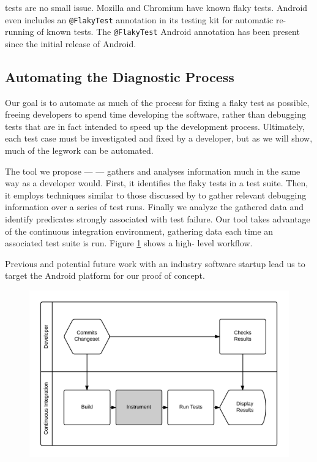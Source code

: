 \Flaky tests are no small issue. Mozilla\cite{mozillaFlakyTestBug} and Chromium
have known flaky tests. Android even includes an {\tt @FlakyTest}
annotation\cite{androidFlakyInterface} in its testing kit for automatic re-
running of known \flaky tests. The {\tt @FlakyTest} Android annotation has been
present since the initial release of Android.


\subsection{Automating the Diagnostic Process}

Our goal is to automate as much of the process for fixing a flaky test as
possible, freeing developers to spend time developing the software, rather than
debugging tests that are in fact intended to speed up the development process.
Ultimately, each test case must be investigated and fixed by a developer, but as
we will show, much of the legwork can be automated.

The tool we propose --- \textit{\splatter} --- gathers and analyses information
much in the same way as a developer would. First, it identifies the flaky tests
in a test suite. Then, it employs techniques similar to those discussed by
\citet{ArumugaNainar:2010:ABI:1806799.1806839} to gather relevant debugging
information over a series of test runs. Finally we analyze the gathered data and
identify predicates strongly associated with test failure. Our tool takes
advantage of the continuous integration environment, gathering data each time an
associated test suite is run. Figure \ref{fig:developer_workflow} shows a high-
level \splatter workflow.

Previous and potential future work with an industry software startup lead us to
target the Android platform for our proof of concept.

\begin{figure}[h]

\includegraphics[width=\linewidth]{Images/developer_workflow}

\caption{}
\label{fig:developer_workflow}
\end{figure}

